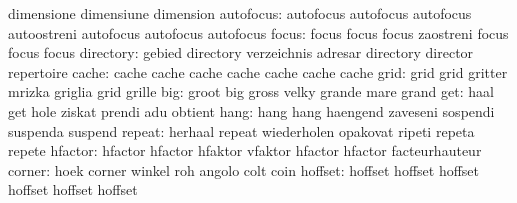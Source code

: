                           dimensione                dimensiune
                           dimension
                autofocus: autofocus                 autofocus
                           autofocus                 autoostreni
                           autofocus                 autofocus
                           autofocus
                    focus: focus                     focus
                           focus                     zaostreni
                           focus                     focus
                           focus
                directory: gebied                    directory
                           verzeichnis               adresar
                           directory                 director
                           repertoire
                    cache: cache                     cache
                           cache                     cache
                           cache                     cache
                           cache
                     grid: grid                      grid
                           gritter                   mrizka
                           griglia                   grid
                           grille
                      big: groot                     big
                           gross                     velky
                           grande                    mare
                           grand
                      get: haal                      get
                           hole                      ziskat
                           prendi                    adu
                           obtient
                     hang: hang                      hang
                           haengend                  zaveseni
                           sospendi                  suspenda
                           suspend
                   repeat: herhaal                   repeat
                           wiederholen               opakovat
                           ripeti                    repeta
                           repete
                  hfactor: hfactor                   hfactor
                           hfaktor                   vfaktor
                           hfactor                   hfactor
                           facteurhauteur
                   corner: hoek                      corner
                           winkel                    roh
                           angolo                    colt
                           coin
                  hoffset: hoffset                   hoffset
                           hoffset                   hoffset
                           hoffset                   hoffset
